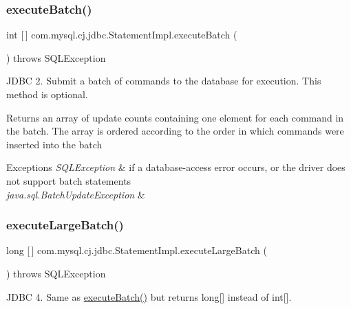 \subsubsection{\texorpdfstring{execute\+Batch()}{executeBatch()}}
{\footnotesize\ttfamily int \mbox{[}$\,$\mbox{]} com.\+mysql.\+cj.\+jdbc.\+Statement\+Impl.\+execute\+Batch (\begin{DoxyParamCaption}{ }\end{DoxyParamCaption}) throws S\+Q\+L\+Exception}

J\+D\+BC 2. Submit a batch of commands to the database for execution. This method is optional.

\begin{DoxyReturn}{Returns}
an array of update counts containing one element for each command in the batch. The array is ordered according to the order in which commands were inserted into the batch
\end{DoxyReturn}

\begin{DoxyExceptions}{Exceptions}
{\em S\+Q\+L\+Exception} & if a database-\/access error occurs, or the driver does not support batch statements \\
\hline
{\em java.\+sql.\+Batch\+Update\+Exception} & \\
\hline
\end{DoxyExceptions}
\mbox{\label{classcom_1_1mysql_1_1cj_1_1jdbc_1_1_statement_impl_ad5138e585c47eef34667efe73d0a954f}} 
\subsubsection{\texorpdfstring{execute\+Large\+Batch()}{executeLargeBatch()}}
{\footnotesize\ttfamily long \mbox{[}$\,$\mbox{]} com.\+mysql.\+cj.\+jdbc.\+Statement\+Impl.\+execute\+Large\+Batch (\begin{DoxyParamCaption}{ }\end{DoxyParamCaption}) throws S\+Q\+L\+Exception}

J\+D\+BC 4. Same as \mbox{\hyperlink{classcom_1_1mysql_1_1cj_1_1jdbc_1_1_statement_impl_a812ff94727864cc68fe96aaa38dbce6a}{execute\+Batch()}} but returns long\mbox{[}\mbox{]} instead of int\mbox{[}\mbox{]}. \mbox{\label{classcom_1_1mysql_1_1cj_1_1jdbc_1_1_statement_impl_a33be0126be83d0094c9d363132497a4e}} 
